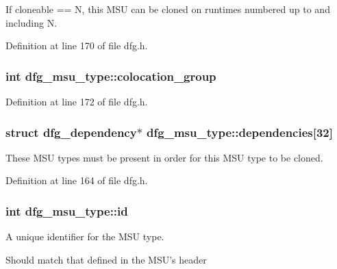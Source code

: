 If cloneable == N, this M\-S\-U can be cloned on runtimes numbered up to and including N. 



Definition at line 170 of file dfg.\-h.

\hypertarget{structdfg__msu__type_ac40772c8600420c05ee16ff9ea527c95}{
\subsubsection[{colocation\-\_\-group}]{\setlength{\rightskip}{0pt plus 5cm}int dfg\-\_\-msu\-\_\-type\-::colocation\-\_\-group}}\label{structdfg__msu__type_ac40772c8600420c05ee16ff9ea527c95}


Definition at line 172 of file dfg.\-h.

\hypertarget{structdfg__msu__type_ae99af1194aeded6b89928e96dfb054d4}{
\subsubsection[{dependencies}]{\setlength{\rightskip}{0pt plus 5cm}struct {\bf dfg\-\_\-dependency}$\ast$ dfg\-\_\-msu\-\_\-type\-::dependencies\mbox{[}32\mbox{]}}}\label{structdfg__msu__type_ae99af1194aeded6b89928e96dfb054d4}


These M\-S\-U types must be present in order for this M\-S\-U type to be cloned. 



Definition at line 164 of file dfg.\-h.

\hypertarget{structdfg__msu__type_a25713ab319d35972ecb502b8c998d5c2}{
\subsubsection[{id}]{\setlength{\rightskip}{0pt plus 5cm}int dfg\-\_\-msu\-\_\-type\-::id}}\label{structdfg__msu__type_a25713ab319d35972ecb502b8c998d5c2}


A unique identifier for the M\-S\-U type. 

Should match that defined in the M\-S\-U's header 

